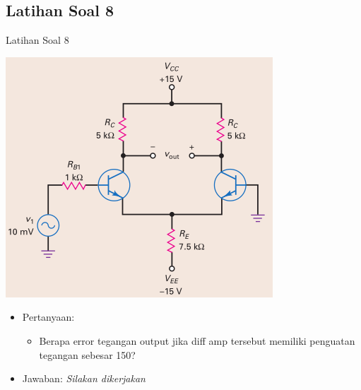 \documentclass[aspectratio=169]{beamer}
\begin{document}
\subsection{Latihan Soal 8}
\begin{frame}{Latihan Soal 8}
	\begin{multicols}{2}
		\begin{center}
			\includegraphics[height=0.7\textheight]{gambar/01.latihan_soal_8}
		\end{center}
		\columnbreak
		\begin{itemize}
			\item Pertanyaan:
			\begin{itemize}
				\item Berapa error tegangan output jika diff amp tersebut memiliki penguatan tegangan sebesar 150?
			\end{itemize}
			\item Jawaban: \textit{Silakan dikerjakan}
		\end{itemize}
	\end{multicols}
\end{frame}
\end{document}

